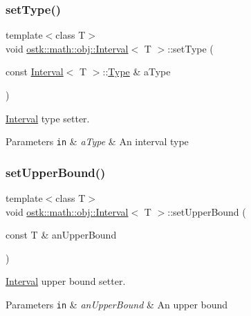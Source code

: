 \subsubsection{\texorpdfstring{set\+Type()}{setType()}}
{\footnotesize\ttfamily template$<$class T$>$ \\
void \hyperlink{classostk_1_1math_1_1obj_1_1_interval}{ostk\+::math\+::obj\+::\+Interval}$<$ T $>$\+::set\+Type (\begin{DoxyParamCaption}\item[{const \hyperlink{classostk_1_1math_1_1obj_1_1_interval}{Interval}$<$ T $>$\+::\hyperlink{classostk_1_1math_1_1obj_1_1_interval_base_a0dd9bd29a9bfefa26de9b88ac81de92a}{Type} \&}]{a\+Type }\end{DoxyParamCaption})}



\hyperlink{classostk_1_1math_1_1obj_1_1_interval}{Interval} type setter. 


\begin{DoxyParams}[1]{Parameters}
\mbox{\tt in}  & {\em a\+Type} & An interval type \\
\hline
\end{DoxyParams}
\mbox{\label{classostk_1_1math_1_1obj_1_1_interval_a5e53477bc77dea2587283a1fa73b3659}} 
\subsubsection{\texorpdfstring{set\+Upper\+Bound()}{setUpperBound()}}
{\footnotesize\ttfamily template$<$class T$>$ \\
void \hyperlink{classostk_1_1math_1_1obj_1_1_interval}{ostk\+::math\+::obj\+::\+Interval}$<$ T $>$\+::set\+Upper\+Bound (\begin{DoxyParamCaption}\item[{const T \&}]{an\+Upper\+Bound }\end{DoxyParamCaption})}



\hyperlink{classostk_1_1math_1_1obj_1_1_interval}{Interval} upper bound setter. 


\begin{DoxyParams}[1]{Parameters}
\mbox{\tt in}  & {\em an\+Upper\+Bound} & An upper bound \\
\hline
\end{DoxyParams}
\mbox{\label{classostk_1_1math_1_1obj_1_1_interval_abe58217bb3d134390c49652e53e2e57e}} 
